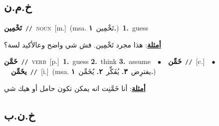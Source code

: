 \documentclass[10pt,a4paper,twoside]{article} %
\begin{document}
\begin{multicols}{2}
\vspace{-3mm}
\subsection*{\color{blue}\foreignlanguage{arabic}{خ.م.ن}\color{blue}{}} 

{\setlength\topsep{0pt}\textbf{\foreignlanguage{arabic}{تَخْمِين}}\ {\color{gray}\texttt{//}\color{black}}\ \textsc{noun}\ [m.]\ \color{gray}(msa. \foreignlanguage{arabic}{تَخْمِين}~\foreignlanguage{arabic}{\textbf{١.}})\color{black}\ \textbf{1.}~guess\  \begin{flushright}\color{gray}\foreignlanguage{arabic}{\textbf{\underline{\foreignlanguage{arabic}{أمثلة}}}: هذا مجرد تَخْمِين. فش شي واضح وعالأكيد لسة؟}\end{flushright}\color{black}} \vspace{2mm}

{\setlength\topsep{0pt}\textbf{\foreignlanguage{arabic}{خَمَّن}}\ {\color{gray}\texttt{//}\color{black}}\ \textsc{verb}\ [p.]\ \textbf{1.}~guess  \textbf{2.}~think  \textbf{3.}~assume\ \ $\bullet$\ \ \setlength\topsep{0pt}\textbf{\foreignlanguage{arabic}{خَمِّن}}\ {\color{gray}\texttt{//}\color{black}}\ [c.]\ \ $\bullet$\ \ \setlength\topsep{0pt}\textbf{\foreignlanguage{arabic}{يخَمِّن}}\ {\color{gray}\texttt{//}\color{black}}\ [i.]\ \color{gray}(msa. \foreignlanguage{arabic}{يفترِض}~\foreignlanguage{arabic}{\textbf{٣.}}  \foreignlanguage{arabic}{يُفَكِّر}~\foreignlanguage{arabic}{\textbf{٢.}}  \foreignlanguage{arabic}{يُخَمِّن}~\foreignlanguage{arabic}{\textbf{١.}})\color{black}\  \begin{flushright}\color{gray}\foreignlanguage{arabic}{\textbf{\underline{\foreignlanguage{arabic}{أمثلة}}}: أنا خَمَّنِت انه يمكن تكون حامل أو هيك شي}\end{flushright}\color{black}} \vspace{2mm}

\vspace{-3mm}
\subsection*{\color{blue}\foreignlanguage{arabic}{خ.ن.ب}\color{blue}{}} 


\end{multicols}
\end{document}

